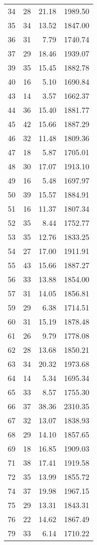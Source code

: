 \begin{appendix}
\begin{longtable}{rrrr}
34 & 28 & 21.18 & 1989.50 \\
35 & 34 & 13.52 & 1847.00 \\
36 & 31 & 7.79 & 1740.74 \\
37 & 29 & 18.46 & 1939.07 \\
39 & 35 & 15.45 & 1882.78 \\
40 & 16 & 5.10 & 1690.84 \\
43 & 14 & 3.57 & 1662.37 \\
44 & 36 & 15.40 & 1881.77 \\
45 & 42 & 15.66 & 1887.29 \\
46 & 32 & 11.48 & 1809.36 \\
47 & 18 & 5.87 & 1705.01 \\
48 & 30 & 17.07 & 1913.10 \\
49 & 16 & 5.48 & 1697.97 \\
50 & 39 & 15.57 & 1884.91 \\
51 & 16 & 11.37 & 1807.34 \\
52 & 35 & 8.44 & 1752.77 \\
53 & 35 & 12.76 & 1833.25 \\
54 & 27 & 17.00 & 1911.91 \\
55 & 43 & 15.66 & 1887.27 \\
56 & 33 & 13.88 & 1854.00 \\
57 & 31 & 14.05 & 1856.81 \\
59 & 29 & 6.38 & 1714.51 \\
60 & 31 & 15.19 & 1878.48 \\
61 & 26 & 9.79 & 1778.08 \\
62 & 28 & 13.68 & 1850.21 \\
63 & 34 & 20.32 & 1973.68 \\
64 & 14 & 5.34 & 1695.34 \\
65 & 33 & 8.57 & 1755.30 \\
66 & 37 & 38.36 & 2310.35 \\
67 & 32 & 13.07 & 1838.93 \\
68 & 29 & 14.10 & 1857.65 \\
69 & 18 & 16.85 & 1909.03 \\
71 & 38 & 17.41 & 1919.58 \\
72 & 35 & 13.99 & 1855.72 \\
74 & 37 & 19.98 & 1967.15 \\
75 & 29 & 13.31 & 1843.31 \\
76 & 22 & 14.62 & 1867.49 \\
79 & 33 & 6.14 & 1710.22 \\
\bottomrule
\end{longtable}


\end{appendix}
